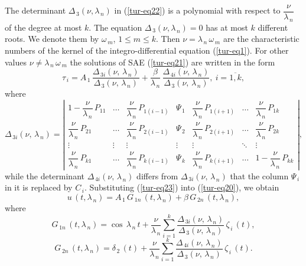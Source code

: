 ﻿\documentclass[
11pt,%
tightenlines,%
twoside,%
onecolumn,%
nofloats,%
nobibnotes,%
nofootinbib,%
superscriptaddress,%
noshowpacs,%
centertags]%
{revtex4}
\begin{document}
The determinant $\Delta_{\, 3} (\nu , \lambda_{\, n})$ in (\ref{tur-eq22}) is a polynomial with respect to $\dfrac{\nu}{\lambda_{\, n}}$ of the degree at most $k$.  The equation $\Delta_{\, 3} (\nu , \lambda_{\, n})=0$ has at most $k$ different roots. We denote them by $\omega_{\, m}$, $1 \le m \le k$. Then $\nu=\lambda_{\, n} \, \omega_{\, m}$ are the characteristic numbers of the kernel of the integro-differential equation (\ref{tur-eq1}).	For other values $\nu \ne \lambda_{\, n} \, \omega_{\, m}$ the solutions of SAE (\ref{tur-eq21}) are written in the form            
\begin {equation}\label{tur-eq23}
\tau_{\, i }=A_{\, 1} \, \dfrac{\Delta_{\, 3 i }(\nu , \, \lambda_{\, n})}{\Delta_{\, 3} (\nu , \, \lambda_{\, n})}+\dfrac{\beta}{\lambda_{\, n}} \, \dfrac{\Delta_{\, 4 i }(\nu , \, \lambda_{\, n})}{\Delta_{\, 3} (\nu , \, \lambda_{\, n})} , \: i=\overline{1 , k} , 
\end{equation}
where 
\[
\Delta_{\, 3 i} (\nu , \, \lambda_{\, n})=\left| \begin{array}{ccccccc}
1-\dfrac{\nu}{\lambda_{\, n}} \, P_{11 } & \ldots & \dfrac{\nu}{\lambda_{\, n}} \, P_{1 (i-1) } & \Psi_{\, 1 }  & \dfrac{\nu}{\lambda_{\, n}} \, P_{1 (i+1) } & \ldots & \dfrac{\nu}{\lambda_{\, n}} \, P_{1 k }\\
\dfrac{\nu}{\lambda_{\, n}} \, P_{2 1 } & \ldots & \dfrac{\nu}{\lambda_{\, n}} \, P_{2 (i-1) }  & \Psi_{\, 2}  & \dfrac{\nu}{\lambda_{\, n}} \, P_{2 (i+1) } &  \ldots & \dfrac{\nu}{\lambda_{\, n}} \, P_{2 k } \\
\vdots &  \vdots & \vdots & \vdots & \vdots &  \ddots & \vdots \\
\dfrac{\nu}{\lambda_{\, n}} \, P_{k 1 } & \ldots & \dfrac{\nu}{\lambda_{\, n}} \, P_{k (i-1) } & \Psi_{\, k}  & \dfrac{\nu}{\lambda_{\, n}} \, P_{k (i+1) } & \ldots  & 1-\dfrac{\nu}{\lambda_{\, n}} \, P_{k k }
\end{array} \right|, 
\]
while the determinant $\Delta_{\, 4 i} (\nu , \, \lambda_{\, n})$ differs from $\Delta_{\, 3 i} (\nu , \, \lambda_{\, n})$ that the column $\Psi_{\, i}$ in it is replaced by $C_{\, i}$. Substituting (\ref{tur-eq23}) into (\ref{tur-eq20}), we obtain 	
\begin{equation} \label{tur-eq24}	
u \, (t , \lambda_{\, n})=A_{\, 1} \, G_{\, 1 n} \, (t , \lambda_{\, n})+\beta \, G_{\, 2 n} \, (t , \lambda_{\, n}) ,
\end{equation} 
where
\[
G_{\, 1 n} \, (t , \lambda_{\, n})=\cos \, \lambda_{\, n} \, t+\frac{\nu}{\lambda_{\, n}} \sum \limits_{i=1}^{k}  \frac{\Delta_{\, 3 i }(\nu , \, \lambda_{\, n})}{\Delta_{\, 3} (\nu , \, \lambda_{\, n})} \, \zeta_{\, i} \, (t) ,
\]
\[
G_{\, 2 n} \, (t , \lambda_{\, n})=\delta_{\, 2} \, (t)+\frac{\nu}{\lambda_{\, n}} \sum \limits_{i=1}^{k}  \frac{\Delta_{\, 4 i }(\nu , \, \lambda_{\, n})}{\Delta_{\, 3} (\nu , \, \lambda_{\, n})} \, \zeta_{\, i} \, (t) .
\]
	
\end{document}
